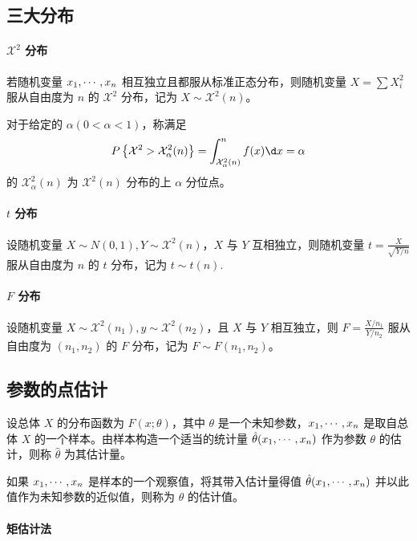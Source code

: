 \subsection{三大分布}

\newcommand{\calX}{\mathcal{X}}

\paragraph{$\calX^2$ 分布}

若随机变量 $x_1,\cdots,x_n$ 相互独立且都服从标准正态分布，则随机变量 $X = \sum X_i^2$ 服从自由度为 $n$ 的 $\calX^2$ 分布，记为 $X \sim \calX^2(n)$。

对于给定的 $\alpha(0 < \alpha < 1)$，称满足
\[ P\left\{\calX^2 > \calX_\alpha^2(n)\right\} = \int_{\calX_\alpha^2(n)}^n f(x) \d x = \alpha  \]
的 $\calX_\alpha^2(n)$ 为 $\calX^2(n)$ 分布的上 $\alpha$ 分位点。

\paragraph{$t$ 分布}

设随机变量 $X \sim N(0, 1), Y \sim \calX^2(n)$，$X$ 与 $Y$ 互相独立，则随机变量 $t = \frac{X}{\sqrt{Y / n}}$ 服从自由度为 $n$ 的 $t$ 分布，记为 $t \sim t(n)$.

\paragraph{$F$ 分布}

设随机变量 $X \sim \calX^2(n_1), y \sim \calX^2(n_2)$，且 $X$ 与 $Y$ 相互独立，则 $F = \frac{X / n_1}{Y / n_2}$ 服从自由度为 $(n_1, n_2)$ 的 $F$ 分布，记为 $F \sim F(n_1, n_2)$。

\subsection{参数的点估计}

设总体 $X$ 的分布函数为 $F(x; \theta)$，其中 $\theta$ 是一个未知参数，$x_1,\cdots,x_n$ 是取自总体 $X$ 的一个样本。由样本构造一个适当的统计量 $\hat{\theta}(x_1,\cdots,x_n)$ 作为参数 $\theta$ 的估计，则称 $\hat{\theta}$ 为其估计量。

如果 $x_1,\cdots,x_n$ 是样本的一个观察值，将其带入估计量得值 $\hat{\theta}(x_1,\cdots,x_n)$ 并以此值作为未知参数的近似值，则称为 $\theta$ 的估计值。

\paragraph{矩估计法}

